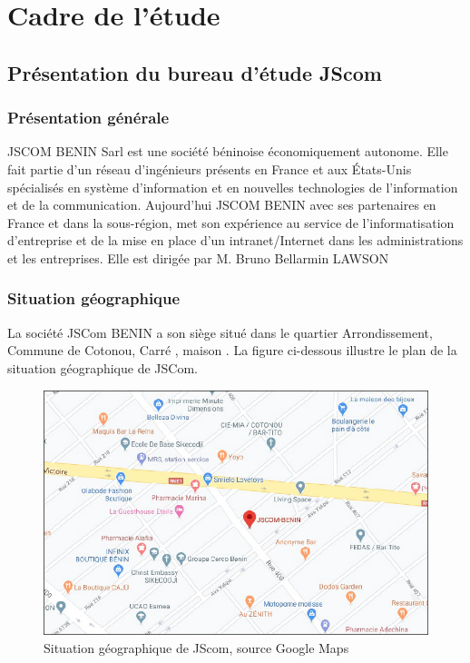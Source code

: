 \documentclass[a4paper,12pt,french]{report} %
\begin{document}

\chapter{Cadre de l'étude}

\section{Présentation du bureau d'étude JScom}
	\subsection{Présentation générale}
	JSCOM BENIN Sarl est une société béninoise économiquement autonome. Elle fait partie d'un réseau d'ingénieurs présents en France et aux États-Unis spécialisés en système d'information et en nouvelles technologies de l'information et de la communication. Aujourd'hui JSCOM BENIN avec ses partenaires en France et dans la sous-région, met son expérience au service de l'informatisation d'entreprise et de la mise en place d'un intranet/Internet dans les administrations et les entreprises. Elle est dirigée par M. Bruno Bellarmin LAWSON

	\subsection{Situation géographique}
		La société JSCom BENIN a son siège situé dans le quartier Arrondissement, Commune de Cotonou, Carré , maison . 
		La figure ci-dessous illustre le plan de la situation géographique de JSCom. 
	\begin{figure}[H]
	\centering
	\includegraphics[scale=0.8]{figure/jscom-map.png}		
	\caption{Situation géographique de JScom, source Google Maps}		
	\label{Situation géographique de JScom}
	\end{figure}
		
\end{document}
